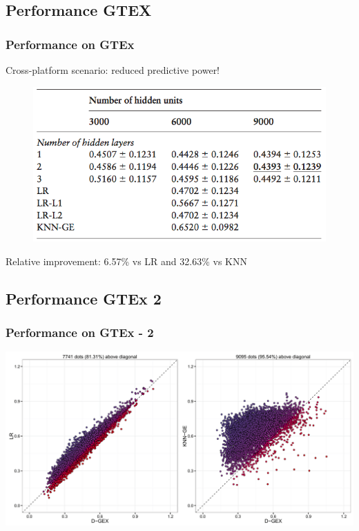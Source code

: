 \documentclass[professionalfont]{beamer}
\begin{document}
    \subsection{Performance GTEX}
    \begin{frame}
      \frametitle{Performance on GTEx}
      Cross-platform scenario: reduced predictive power!
      \begin{figure}
        \includegraphics[scale=0.7]{figures/res-gtex.png}
      \end{figure}
      Relative improvement: 6.57\% vs LR and 32.63\% vs KNN
    \end{frame}

    \subsection{Performance GTEx 2}
    \begin{frame}
      \frametitle{Performance on GTEx - 2}
      \includegraphics[scale=0.47]{figures/res-gtex2.png}
    \end{frame}
\end{document}
